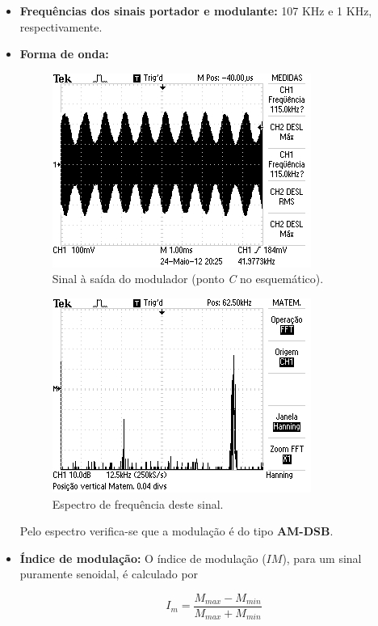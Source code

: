 \documentclass[]{report}
\begin{document}
\begin{itemize}
\item{\bf Frequências dos sinais portador e modulante:} 107 KHz e 1 KHz, respectivamente.

\item{\bf Forma de onda:}
\begin{figure}[H]
\begin{center}
\includegraphics[scale=0.65]{./imagens/AM_Dominio_Tempo}
\end{center}
\caption{Sinal à saída do modulador (ponto \textit{C} no esquemático).}
\label{fig:onda_AM}
\end{figure}
\begin{figure}[H]
\begin{center}
\includegraphics[scale=0.65]{./imagens/AM_Dominio_Frequencia}
\end{center}
\caption{Espectro de frequência deste sinal.}
\label{fig:frequencia_AM}
\end{figure}

Pelo espectro verifica-se que a modulação é do tipo \textbf{AM-DSB}.
\item{\bf Índice de modulação:}
O índice de modulação ($IM$), para um sinal puramente senoidal, é calculado por

\begin{equation}\label{indice_modulacao}
I_m = \frac{M_{max} - M_{min}}{M_{max} + M_{min}}
\end{equation}


\end{itemize}
\end{document}
